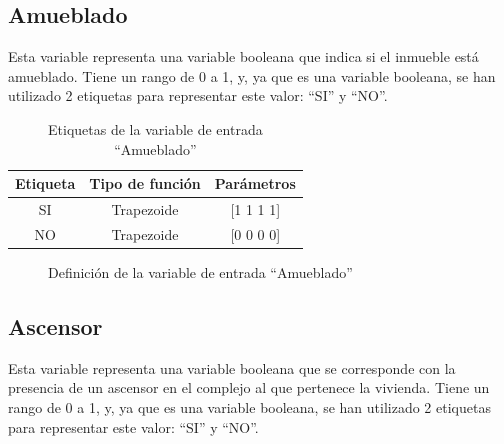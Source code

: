 \documentclass[12pt]{report} %
\begin{document}
        \subsection{Amueblado}
        Esta variable representa una variable booleana que indica si el inmueble está amueblado.
        Tiene un rango de 0 a 1, y, ya que es una variable booleana, se han utilizado 2 etiquetas para representar este valor: ``SI'' y ``NO''.

        \begin{table}[h]
            \center
            \begin{tabular}{@{}ccc@{}}
                \toprule
                \textbf{Etiqueta} & \textbf{Tipo de función} & \textbf{Parámetros} \\
                \midrule
                SI & Trapezoide & [1 1 1 1] \\
                NO & Trapezoide & [0 0 0 0] \\
                \bottomrule
            \end{tabular}
            \caption{Etiquetas de la variable de entrada ``Amueblado''}
        \end{table}

        \begin{figure}[H]
            \centering
            \caption{Definición de la variable de entrada ``Amueblado''}
        \end{figure}

        \subsection{Ascensor}
        Esta variable representa una variable booleana que se corresponde con la presencia de un ascensor en el complejo al que pertenece la vivienda. 
        Tiene un rango de 0 a 1, y, ya que es una variable booleana, se han utilizado 2 etiquetas para representar este valor: ``SI'' y ``NO''.
\end{document}
